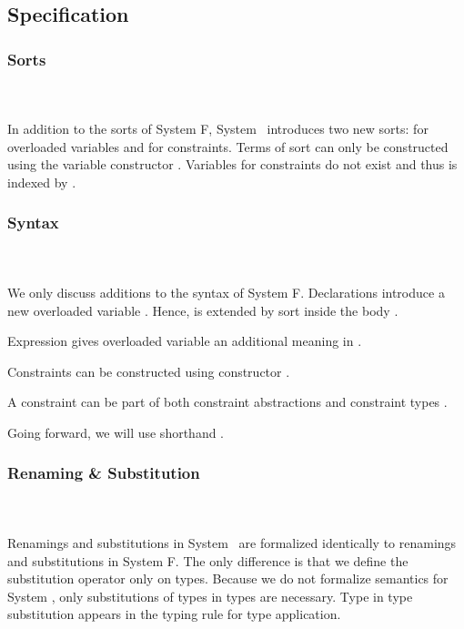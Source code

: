 \subsection{Specification}

\subsubsection{Sorts}\hfill\\\\
In addition to the sorts of System F, System \Fo\ introduces two new sorts:  for overloaded variables and  for constraints.
\FoSort
Terms of sort  can only be constructed using the variable constructor .
Variables for constraints do not exist and thus  is indexed by .

\subsubsection{Syntax}\hfill\\\\
We only discuss additions to the syntax of System F.
\FoTerm
Declarations   introduce a new overloaded variable . 
Hence,  is extended by sort  inside the body . 

\noindent Expression    \Constr{=}    gives overloaded variable  an additional meaning  in . 

\noindent Constraints  can be constructed using constructor   \Constr{:} . 

\noindent A constraint  can be part of both constraint abstractions \Constr{\lambdabar}    and constraint types \Constr{[}  \Constr{]⇒} .

\noindent Going forward, we will use shorthand \FoCstr.

\subsubsection{Renaming \& Substitution}\hfill\\\\
Renamings and substitutions in System \Fo\ are formalized identically to renamings and substitutions in System F. 
The only difference is that we define the substitution operator only on types. 
\Fosubs
Because we do not formalize semantics for System \Fo, only substitutions of types in types are necessary. Type in type substitution appears in the typing rule for type application.

